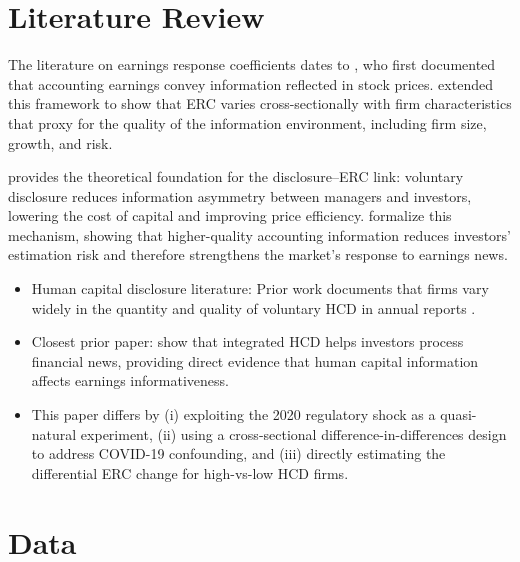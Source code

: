 \documentclass[12pt,english]{article}
\begin{document}
\section{Literature Review}\label{sec:litreview}

The literature on earnings response coefficients dates to \citet{ball1968},
who first documented that accounting earnings convey information reflected in
stock prices. \citet{collins1989} extended this framework to show that ERC
varies cross-sectionally with firm characteristics that proxy for the quality
of the information environment, including firm size, growth, and risk.

\citet{verrecchia2001} provides the theoretical foundation for the
disclosure--ERC link: voluntary disclosure reduces information asymmetry
between managers and investors, lowering the cost of capital and improving
price efficiency. \citet{lambert2007} formalize this mechanism, showing that
higher-quality accounting information reduces investors' estimation risk and
therefore strengthens the market's response to earnings news.

\begin{itemize}
    \item Human capital disclosure literature: Prior work documents that firms
          vary widely in the quantity and quality of voluntary HCD in annual
          reports \citep{demers2024}.
    \item Closest prior paper: \citet{skinner2026} show that integrated HCD
          helps investors process financial news, providing direct evidence
          that human capital information affects earnings informativeness.
    \item This paper differs by (i) exploiting the 2020 regulatory shock as a
          quasi-natural experiment, (ii) using a cross-sectional
          difference-in-differences design to address COVID-19 confounding,
          and (iii) directly estimating the differential ERC change for
          high-vs-low HCD firms.
\end{itemize}


\section{Data}\label{sec:data}
\end{document}
